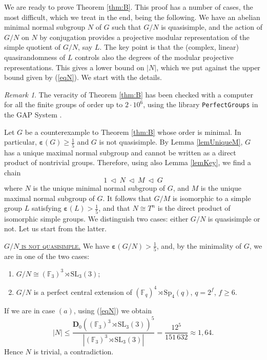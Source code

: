 \documentclass{daj}
\theoremstyle{definition}
\theoremstyle{remark}
\newtheorem{remark}[theorem]{Remark}
\newcommand{\Sp}{\mathrm{Sp}}
\newcommand{\SL}{\mathrm{SL}}
\newcommand{\D}{\mathbf{D}}
\renewcommand{\a}{\boldsymbol{\varepsilon}}
\begin{document}
We are ready to prove Theorem \ref{thm:B}.
This proof has a number of cases, the most difficult, which we treat in the end, being the following.
We have an abelian minimal normal subgroup $N$ of $G$ such that $G/N$ is quasisimple,
and the action of $G/N$ on $N$ by conjugation provides a
	projective modular representation of the simple quotient of $G/N$, say $L$.
	The key point is that the (complex, linear) quasirandomness of $L$ controls also the degrees of the modular projective representations.
	This gives a lower bound on $|N|$, which we put against the upper bound given by (\ref{eqN}).
	We start with the details.

\begin{remark} 	\label{rem:calculator}
The veracity of Theorem \ref{thm:B} has been checked with a computer for all the finite groups of order up to $2\cdot 10^6$,
using the library \texttt{PerfectGroups} in the GAP System \cite{GAP}.
\end{remark} 

	Let $G$ be a counterexample to Theorem \ref{thm:B} whose order is minimal.
	In particular, $\a(G) \geq \frac{1}{5}$ and $G$ is not quasisimple.
	By Lemma \ref{lemUniqueM}, $G$ has a unique maximal normal subgroup and cannot be written as a direct product of nontrivial groups.
	Therefore, using also Lemma \ref{lemKey}, we find a chain
	$$ 1 \> \lhd \> N \> \lhd \> M \> \lhd \> G  $$
	where $N$ is the unique minimal normal subgroup of $G$, and $M$ is the unique maximal normal subgroup of $G$.
	It follows that $G/M$ is isomorphic to a simple group $L$ satisfying $\a(L) > \frac{1}{5}$,
	and that $N \cong T^n$ is the direct product of isomorphic simple groups. 
	We distinguish two cases: either $G/N$ is quasisimple or not.
	Let us start from the latter.
	
	\medskip \noindent \textsc{\underline{$G/N$ is not quasisimple.}}
	We have $\a(G/N) > \frac{1}{5}$, and, by the minimality of $G$, we are in one of the two cases:
	\begin{enumerate}[$(a)$]
		\item $G/N \cong (\mathbb{F}_3)^3 \rtimes \SL_3(3)$;
		\item $G/N$ is a perfect central extension of $(\mathbb{F}_{q})^4 \rtimes \Sp_4(q)$, $q=2^f$, $f \geq 6$.
	\end{enumerate}

	If we are in case $(a)$, using (\ref{eqN}) we obtain
	$$ |N| \leq \frac{\D_0((\mathbb{F}_3)^3 \rtimes \SL_3(3))^5}{|(\mathbb{F}_3)^3 \rtimes \SL_3(3)|} = \frac{12^5}{151\,632} \approx 1,64 . $$
	Hence $N$ is trivial, a contradiction.
	
\end{document}
